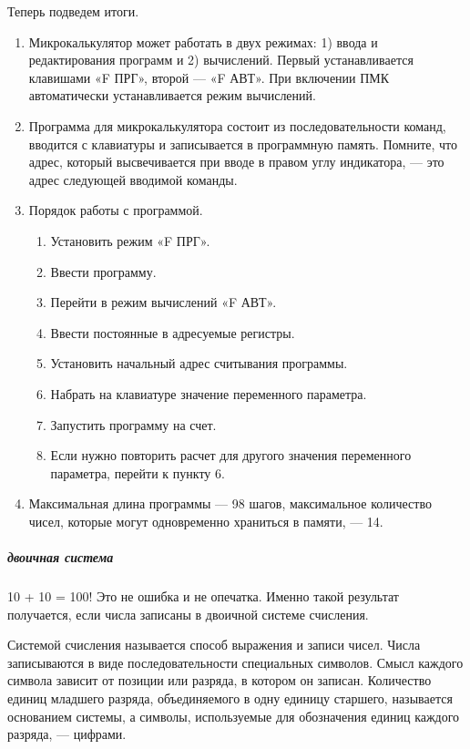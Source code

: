 \documentclass[11pt,a4paper,oneside]{article}
\providecommand{\tightlist}{%
    \setlength{\itemsep}{0pt}\setlength{\parskip}{0pt}}
\begin{document}
Теперь подведем итоги.
\begin{enumerate}
\tightlist
\item Микрокалькулятор может работать в двух режимах: 1) ввода и редактирования программ и 2) вычислений. Первый устанавливается клавишами «F ПРГ», второй — «F АВТ». При включении ПМК автоматически устанавливается режим вычислений.
\item Программа для микрокалькулятора состоит из последовательности команд, вводится с клавиатуры и записывается в программную память. Помните, что адрес, который высвечивается при вводе в правом углу индикатора, — это адрес следующей вводимой команды.
\item Порядок работы с программой.
\begin{enumerate}[label=\arabic*)]
\item Установить режим «F ПРГ».
\item Ввести программу.
\item Перейти в режим вычислений «F АВТ».
\item Ввести постоянные в адресуемые регистры.
\item Установить начальный адрес считывания программы.
\item Набрать на клавиатуре значение переменного параметра.
\item Запустить программу на счет.
\item Если нужно повторить расчет для другого значения переменного параметра, перейти к пункту 6.
\end{enumerate}
\item Максимальная длина программы — 98 шагов, максимальное количество чисел, которые могут одновременно храниться в памяти, — 14.
\end{enumerate}

\subparagraph{двоичная система}
10 + 10 = 100!
Это не ошибка и не опечатка. Именно такой результат получается, если числа записаны в двоичной системе счисления.

Системой счисления называется способ выражения и записи чисел. Числа записываются в виде последовательности специальных символов. Смысл каждого символа зависит от позиции или разряда, в котором он записан. Количество единиц младшего разряда, объединяемого в одну единицу старшего, называется основанием системы, а символы, используемые для обозначения единиц каждого разряда, — цифрами.
\end{document}
